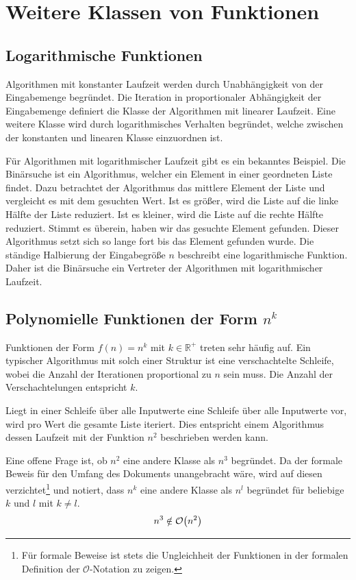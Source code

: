 \section{Weitere Klassen von Funktionen}
%
\subsection{Logarithmische Funktionen}
%
Algorithmen mit konstanter Laufzeit werden durch Unabhängigkeit von der Eingabemenge begründet. Die Iteration in proportionaler Abhängigkeit der Eingabemenge definiert die Klasse der Algorithmen mit linearer Laufzeit. Eine weitere Klasse wird durch logarithmisches Verhalten begründet, welche zwischen der konstanten und linearen Klasse einzuordnen ist.

Für Algorithmen mit logarithmischer Laufzeit gibt es ein bekanntes Beispiel. Die Binärsuche ist ein Algorithmus, welcher ein Element in einer geordneten Liste findet. Dazu betrachtet der Algorithmus das mittlere Element der Liste und vergleicht es mit dem gesuchten Wert. Ist es größer, wird die Liste auf die linke Hälfte der Liste reduziert. Ist es kleiner, wird die Liste auf die rechte Hälfte reduziert. Stimmt es überein, haben wir das gesuchte Element gefunden. Dieser Algorithmus setzt sich so lange fort bis das Element gefunden wurde. Die ständige Halbierung der Eingabegröße $n$ beschreibt eine logarithmische Funktion. Daher ist die Binärsuche ein Vertreter der Algorithmen mit logarithmischer Laufzeit.
%
\subsection{Polynomielle Funktionen der Form $n^k$}
%
Funktionen der Form $f(n) = n^k$ mit $k \in \mathbb{R}^+$ treten sehr häufig auf. Ein typischer Algorithmus mit solch einer Struktur ist eine verschachtelte Schleife, wobei die Anzahl der Iterationen proportional zu $n$ sein muss. Die Anzahl der Verschachtelungen entspricht $k$.

Liegt in einer Schleife über alle Inputwerte eine Schleife über alle Inputwerte vor, wird pro Wert die gesamte Liste iteriert. Dies entspricht einem Algorithmus dessen Laufzeit mit der Funktion $n^2$ beschrieben werden kann.

Eine offene Frage ist, ob $n^2$ eine andere Klasse als $n^3$ begründet. Da der formale Beweis für den Umfang des Dokuments unangebracht wäre, wird auf diesen verzichtet\footnote{Für formale Beweise ist stets die Ungleichheit der Funktionen in der formalen Definition der $\mathcal{O}$-Notation zu zeigen.} und notiert, dass $n^k$ eine andere Klasse als $n^l$ begründet für beliebige $k$ und $l$ mit $k \neq l$.
\[
  n^3 \notin \mathcal{O}\!\left(n^2\right)
\]
%
